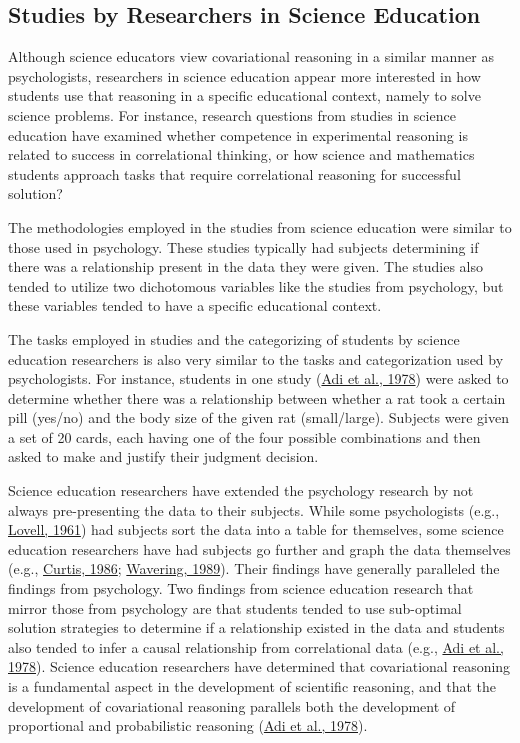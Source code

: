\documentclass[11pt]{umnthesis}
\begin{document}
\hypertarget{studies-by-researchers-in-science-education}{%
\subsection{Studies by Researchers in Science Education}\label{studies-by-researchers-in-science-education}}

Although science educators view covariational reasoning in a similar manner as psychologists, researchers in science education appear more interested in how students use that reasoning in a specific educational context, namely to solve science problems. For instance, research questions from studies in science education have examined whether competence in experimental reasoning is related to success in correlational thinking, or how science and mathematics students approach tasks that require correlational reasoning for successful solution?

The methodologies employed in the studies from science education were similar to those used in psychology. These studies typically had subjects determining if there was a relationship present in the data they were given. The studies also tended to utilize two dichotomous variables like the studies from psychology, but these variables tended to have a specific educational context.

The tasks employed in studies and the categorizing of students by science education researchers is also very similar to the tasks and categorization used by psychologists. For instance, students in one study (\protect\hyperlink{ref-adi:1978}{Adi et al., 1978}) were asked to determine whether there was a relationship between whether a rat took a certain pill (yes/no) and the body size of the given rat (small/large). Subjects were given a set of 20 cards, each having one of the four possible combinations and then asked to make and justify their judgment decision.

Science education researchers have extended the psychology research by not always pre-presenting the data to their subjects. While some psychologists (e.g., \protect\hyperlink{ref-lovell:1961}{Lovell, 1961}) had subjects sort the data into a table for themselves, some science education researchers have had subjects go further and graph the data themselves (e.g., \protect\hyperlink{ref-curtis:1986}{Curtis, 1986}; \protect\hyperlink{ref-wavering:1989}{Wavering, 1989}). Their findings have generally paralleled the findings from psychology. Two findings from science education research that mirror those from psychology are that students tended to use sub-optimal solution strategies to determine if a relationship existed in the data and students also tended to infer a causal relationship from correlational data (e.g., \protect\hyperlink{ref-adi:1978}{Adi et al., 1978}). Science education researchers have determined that covariational reasoning is a fundamental aspect in the development of scientific reasoning, and that the development of covariational reasoning parallels both the development of proportional and probabilistic reasoning (\protect\hyperlink{ref-adi:1978}{Adi et al., 1978}).
\end{document}
